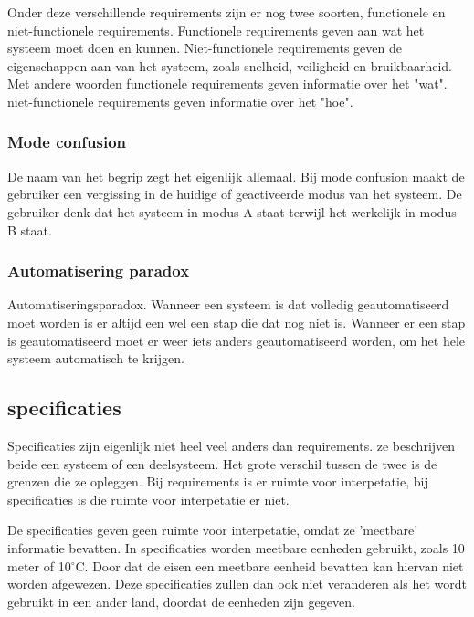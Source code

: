 \documentclass{article}%
\begin{document}
Onder deze verschillende requirements zijn er nog twee soorten, functionele en niet-functionele requirements. 
Functionele requirements geven aan wat het systeem moet doen en kunnen. Niet-functionele requirements geven de eigenschappen aan van het systeem, zoals snelheid, veiligheid en bruikbaarheid. Met andere woorden functionele requirements geven informatie over het "wat". niet-functionele requirements geven informatie over het "hoe".

\subsubsection{Mode confusion}
De naam van het begrip zegt het eigenlijk allemaal. Bij mode confusion maakt de gebruiker een vergissing in de huidige of geactiveerde modus van het systeem. De gebruiker denk dat het systeem in modus A staat terwijl het werkelijk in modus B staat. 

\subsubsection{Automatisering paradox}
Automatiseringsparadox. Wanneer een systeem is dat volledig geautomatiseerd moet worden is er altijd een wel een stap die dat nog niet is. Wanneer er een stap is geautomatiseerd moet er weer iets anders geautomatiseerd worden, om het hele systeem automatisch te krijgen.

\subsection{specificaties}
Specificaties zijn eigenlijk niet heel veel anders dan requirements. ze beschrijven beide een systeem of een deelsysteem. Het grote verschil tussen de twee is de grenzen die ze opleggen. Bij requirements is er ruimte voor interpetatie, bij specificaties is die ruimte voor interpetatie er niet.

De specificaties geven geen ruimte voor interpetatie, omdat ze 'meetbare' informatie bevatten. In specificaties worden meetbare eenheden gebruikt, zoals 10 meter of 10$^{\circ}$C. Door dat de eisen een meetbare eenheid bevatten kan hiervan niet worden afgewezen. Deze specificaties zullen dan ook niet veranderen als het wordt gebruikt in een ander land, doordat de eenheden zijn gegeven.
\\
\end{document}
